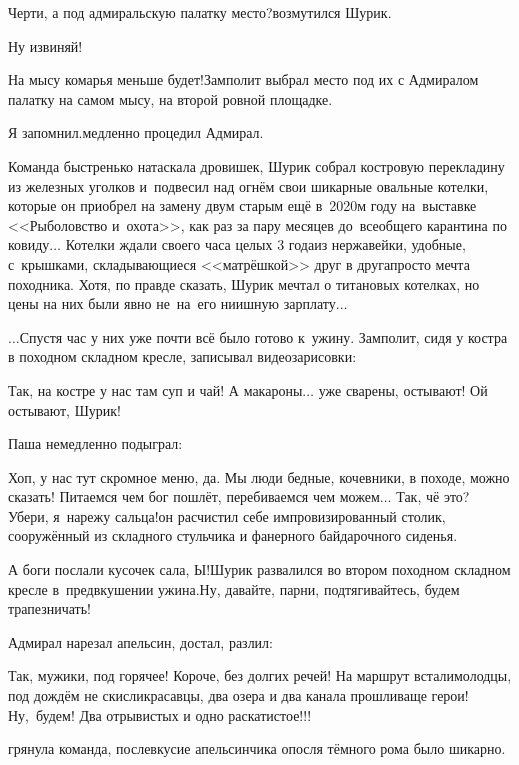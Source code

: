 \diagdash Черти, а под адмиральскую палатку место?\mdash возмутился Шурик.

\diagdash Ну извиняй!

\diagdash На мысу комарья меньше будет!\mdash Замполит выбрал место под их с Адмиралом палатку на самом мысу, на второй ровной площадке.

\diagdash Я запомнил.\mdash медленно процедил Адмирал.

Команда быстренько натаскала дровишек, Шурик собрал костровую перекладину из железных уголков и~подвесил над огнём свои шикарные овальные котелки, которые он приобрел на замену двум старым ещё в~2020\sdash м году на~выставке <<Рыболовство и~охота>>, как раз за пару месяцев до~всеобщего карантина по ковиду$\ldots$ Котелки ждали своего часа целых 3 года\mdash из нержавейки, удобные, с~крышками, складывающиеся <<матрёшкой>> друг в друга\mdash просто мечта походника. Хотя, по правде сказать, Шурик мечтал о титановых котелках, но цены на них были явно не~на~его нии\sdash шную зарплату$\ldots$

$\ldots$Спустя час у них уже почти всё было готово к~ужину. %
Замполит, сидя у костра в походном складном кресле, записывал видеозарисовки:

\diagdash Так, на костре у нас там суп и чай! А макароны$\ldots$ уже сварены, остывают! Ой остывают, Шурик!

Паша немедленно подыграл:

\diagdash Хоп, у нас тут скромное меню, да. Мы люди бедные, кочевники, в походе, можно сказать! Питаемся чем бог пошлёт, перебиваемся чем можем$\ldots$ Так, чё это? Убери, я~нарежу сальца!\mdash он расчистил себе импровизированный столик, сооружённый из складного стульчика и фанерного байдарочного сиденья.

\diagdash А боги послали кусочек сала, Ы!\mdash Шурик развалился во втором походном складном кресле в~предвкушении ужина.\mdash Ну, давайте, парни, подтягивайтесь, будем трапезничать!

Адмирал нарезал апельсин, достал, разлил: 

\diagdash Так, мужики, под горячее! Короче, без долгих речей! На маршрут встали\mdash молодцы, под дождём не скисли\mdash красавцы, два озера и два канала прошли\mdash ваще герои! Ну,~будем! Два отрывистых и одно раскатистое!!!

\mdash грянула команда, послевкусие апельсинчика опосля тёмного рома было шикарно.

